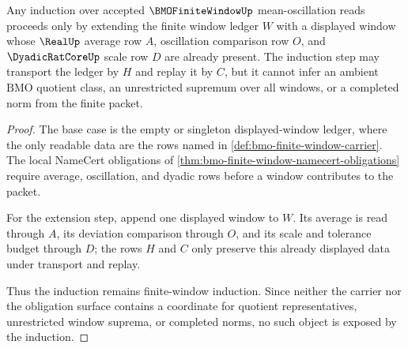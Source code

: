 \begin{theorem}
\label{thm:bmo-finite-window-mean-oscillation-induction}
Any induction over accepted $\BMOFiniteWindowUp$ mean-oscillation reads proceeds only by extending the finite window ledger $W$ with a displayed window whose $\RealUp$ average row $A$, oscillation comparison row $O$, and $\DyadicRatCoreUp$ scale row $D$ are already present. The induction step may transport the ledger by $H$ and replay it by $C$, but it cannot infer an ambient $\mathrm{BMO}$ quotient class, an unrestricted supremum over all windows, or a completed norm from the finite packet.
\end{theorem}
\begin{proof}
The base case is the empty or singleton displayed-window ledger, where the only readable data are the rows named in \autoref{def:bmo-finite-window-carrier}. The local NameCert obligations of \autoref{thm:bmo-finite-window-namecert-obligations} require average, oscillation, and dyadic rows before a window contributes to the packet.

For the extension step, append one displayed window to $W$. Its average is read through $A$, its deviation comparison through $O$, and its scale and tolerance budget through $D$; the rows $H$ and $C$ only preserve this already displayed data under transport and replay.

Thus the induction remains finite-window induction. Since neither the carrier nor the obligation surface contains a coordinate for quotient representatives, unrestricted window suprema, or completed norms, no such object is exposed by the induction.
\end{proof}

